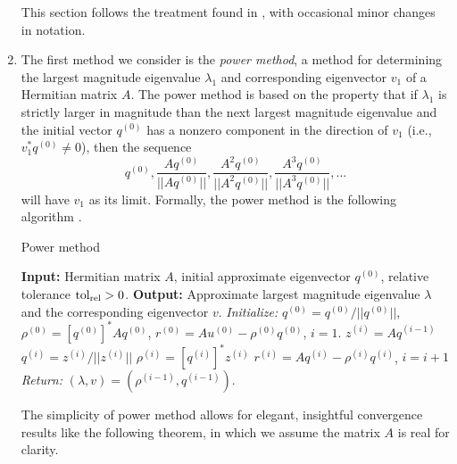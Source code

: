 \begin{enumerate}
This section follows the treatment found in \cite[Chapters 8, 10]{golub2012matrix}, with occasional minor changes in notation.




\item

The first method we consider is the \textit{power method}, a method for determining the largest magnitude eigenvalue $\lambda_1$ and corresponding eigenvector $v_1$ of a Hermitian matrix $A$.  The power method is based on the property that if $\lambda_1$ is strictly larger in magnitude than the next largest magnitude eigenvalue and the initial vector $q^{(0)}$ has a nonzero component in the direction of $v_1$ (i.e., $v_1^*q^{(0)} \neq 0$), then the sequence
\[
q^{(0)}, \frac{Aq^{(0)}}{||Aq^{(0)}||},  \frac{A^2q^{(0)}}{||A^2q^{(0)}||},  \frac{A^3q^{(0)}}{||A^3q^{(0)}||}, \ldots
\]
will have $v_1$ as its limit.  Formally, the power method is the following algorithm \cite[Section 8.2.1]{golub2012matrix}.


\begin{algorithm}[H]
\caption{Power method}	\label{Alg:power_method}

\begin{algorithmic}[1]
	\Statex 	\textbf{Input:} Hermitian matrix $A$, initial approximate eigenvector $q^{(0)}$, relative tolerance $\textnormal{tol}_\textnormal{rel} > 0$.
	\Statex 	\textbf{Output:} Approximate largest magnitude eigenvalue $\lambda$ and the corresponding eigenvector $v$.
	\State		\textit{Initialize:} $q^{(0)} = q^{(0)}/||q^{(0)}||$, $\rho^{(0)} = [q^{(0)}]^*Aq^{(0)}$, $r^{(0)} = Au^{(0)} - \rho^{(0)}q^{(0)}$, $i= 1$.
		\State		$z^{(i)} = Aq^{(i-1)}$
		\State		$q^{(i)} = z^{(i)} / ||z^{(i)}||$
		\State		$\rho^{(i)} = [q^{(i)}]^* z^{(i)}$
		\State		$r^{(i)} = Aq^{(i)} - \rho^{(i)}q^{(i)}$, $i = i + 1$
	\EndWhile
	\State		\textit{Return:} $(\lambda, v) = (\rho^{(i-1)} , q^{(i-1)})$.
\end{algorithmic}

\end{algorithm}


The simplicity of power method allows for elegant, insightful convergence results like the following theorem, in which we assume the matrix $A$ is real for clarity.


\end{enumerate}

